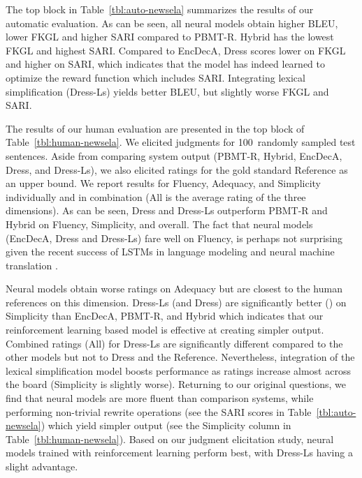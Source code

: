 \documentclass[11pt,letterpaper]{article}
\begin{document}
The top block in Table~\ref{tbl:auto-newsela} summarizes the results
of our automatic evaluation. As can be seen, all neural models obtain
higher BLEU, lower FKGL and higher SARI compared to PBMT-R. Hybrid has
the lowest FKGL and highest SARI.  Compared to EncDecA, {\sc Dress} scores
lower on FKGL and higher on SARI, which indicates that the model has
indeed learned to optimize the reward function which includes SARI.
Integrating lexical simplification ({\sc Dress-Ls}) yields better BLEU, but
slightly worse FKGL and SARI. 

The results of our human evaluation are presented in the top block of
Table~\ref{tbl:human-newsela}. We elicited judgments for 100~randomly
sampled test sentences. Aside from comparing system output (PBMT-R,
Hybrid, EncDecA, {\sc Dress}, and \mbox{{\sc Dress-Ls}}), we also elicited ratings
for the gold standard Reference as an upper bound.  We report results
for Fluency, Adequacy, and Simplicity individually and in combination
(All is the average rating of the three dimensions). 
As can be seen, {\sc Dress} and \mbox{{\sc Dress-Ls}} outperform \mbox{PBMT-R} and Hybrid on Fluency, Simplicity, and overall. The fact that neural
models (EncDecA, {\sc Dress} and \mbox{{\sc Dress-Ls}}) fare well on Fluency, is perhaps not surprising given the
recent success of LSTMs in language modeling and neural machine
translation \cite{zaremba:2014,jean2015montreal}. 

Neural models obtain worse ratings on Adequacy but are closest to the
human references on this dimension.  {\sc Dress-Ls} (and {\sc Dress}) are
significantly better () on Simplicity than EncDecA, PBMT-R,
and Hybrid which indicates that our reinforcement learning based model
is effective at creating simpler output. Combined ratings (All) for
{\sc Dress-Ls} are significantly different compared to the other models but
not to {\sc Dress} and the Reference. Nevertheless, integration of the
lexical simplification model boosts performance as ratings increase almost
across the board (Simplicity is slightly worse). Returning to our original questions, we find that
neural models are more fluent than comparison systems, while
performing non-trivial rewrite operations (see the SARI scores in
Table~\ref{tbl:auto-newsela}) which yield simpler output (see the
Simplicity column in Table~\ref{tbl:human-newsela}). Based on our
judgment elicitation study, neural models trained with reinforcement
learning perform best, with \mbox{{\sc Dress-Ls}} having a slight advantage.
\end{document}
